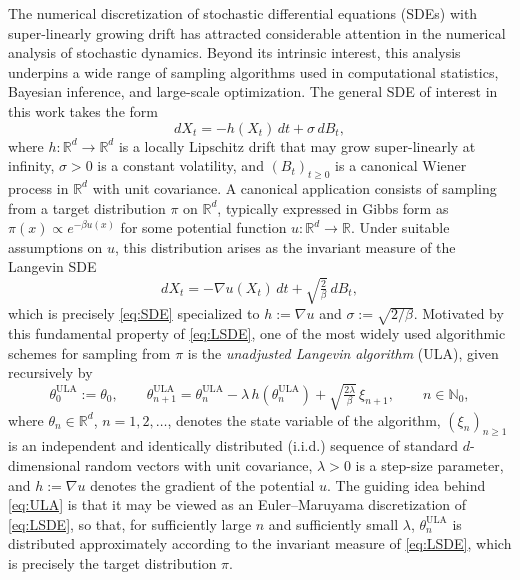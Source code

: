 \documentclass[11pt,a4paper,reqno]{amsart}
\theoremstyle{plain}
\theoremstyle{definition}
\theoremstyle{remark}
\begin{document}
The numerical discretization of stochastic differential equations (SDEs) with super-linearly growing drift has attracted considerable attention in the numerical analysis of stochastic dynamics. Beyond its intrinsic interest, this analysis underpins a wide range of sampling algorithms used in computational statistics, Bayesian inference, and large-scale optimization. The general SDE of interest in this work takes the form
\begin{equation}
  dX_t = -h(X_t)\,dt + \sigma\,dB_t,
  \tag{SDE}\label{eq:SDE}
\end{equation}
where $h : \mathbb{R}^d \to \mathbb{R}^d$ is a locally Lipschitz drift that may grow super-linearly at infinity, $\sigma > 0$ is a constant volatility, and $(B_t)_{t\ge 0}$ is a canonical Wiener process in $\mathbb{R}^d$ with unit covariance. A canonical application consists of sampling from a target distribution $\pi$ on $\mathbb{R}^d$, typically expressed in Gibbs form as $\pi(x) \propto e^{-\beta u(x)}$ for some potential function $u : \mathbb{R}^d \to \mathbb{R}$. Under suitable assumptions on $u$, this distribution arises as the invariant measure of the Langevin SDE
\begin{equation}
  dX_t = -\nabla u(X_t)\,dt + \sqrt{\tfrac{2}{\beta}}\,dB_t,
  \tag{LSDE}\label{eq:LSDE}
\end{equation}
which is precisely \eqref{eq:SDE} specialized to $h := \nabla u$ and $\sigma := \sqrt{2/\beta}$.
Motivated by this fundamental property of \eqref{eq:LSDE}, one of the most widely used
algorithmic schemes for sampling from $\pi$ is the
\emph{unadjusted Langevin algorithm} (ULA), given recursively by
\begin{equation}
  \theta^{\mathrm{ULA}}_{0} := \theta_0, 
  \qquad
  \theta^{\mathrm{ULA}}_{n+1}
  =
  \theta^{\mathrm{ULA}}_{n}
  - \lambda\, h\!\left(\theta^{\mathrm{ULA}}_{n}\right)
  + \sqrt{\tfrac{2\lambda}{\beta}}\,\xi_{n+1},
  \qquad n\in\mathbb{N}_0,
  \tag{ULA}\label{eq:ULA}
\end{equation}
where $\theta_n \in \mathbb{R}^d$, $n=1,2,\ldots$, denotes the state variable of the algorithm,
$(\xi_n)_{n\ge1}$ is an independent and identically distributed (i.i.d.) sequence of
standard $d$-dimensional random vectors with unit covariance,
$\lambda>0$ is a step-size parameter, and $h := \nabla u$ denotes the gradient of the
potential $u$.
The guiding idea behind \eqref{eq:ULA} is that it may be viewed as an Euler--Maruyama
discretization of \eqref{eq:LSDE}, so that, for sufficiently large $n$ and sufficiently small
$\lambda$, $\theta^{\mathrm{ULA}}_n$ is distributed approximately according to the invariant measure of \eqref{eq:LSDE}, which is precisely the target
distribution $\pi$.
\end{document}
